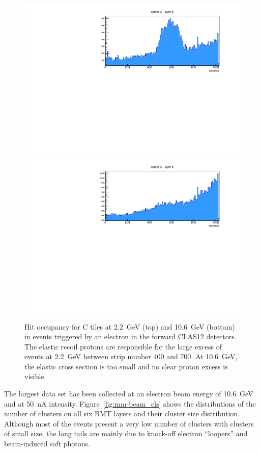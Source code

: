 \begin{figure}[htb]
 \includegraphics[width=1.0\columnwidth]{images/occupancy2GeV}
 \includegraphics[width=1.0\columnwidth]{images/occupancy10GeV}
 \caption{Hit occupancy for C tiles at 2.2~GeV (top) and 10.6~GeV (bottom) in events triggered by an electron in the
   forward CLAS12 detectors. The elastic recoil protons are responsible for the large excess of events at 2.2~GeV
   between strip number 400 and 700. At 10.6~GeV, the elastic cross section is too small and no clear proton excess is
   visible.}
 \label{fig:mm-occupancy_22_10}
\end{figure}

The largest data set has been collected at an electron beam energy of 10.6~GeV and at 50~nA intensity.
Figure~\ref{fig:mm-beam_cls} shows the distributions of the number of clusters on all six BMT layers and their
cluster size distribution. Although most of the events present a very low number of clusters with clusters of small size,
the long tails are mainly due to knock-off electron ``loopers'' and beam-induced soft photons.

